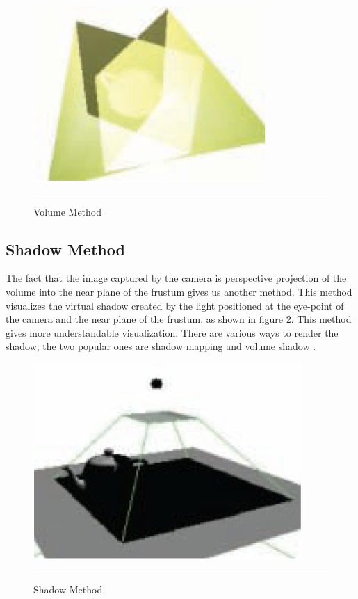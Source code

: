 \begin{figure}[htbp]
	\centering
	\includegraphics{./Primitives/theory_volume.png}
	\rule{35em}{0.5pt}
	\caption[Volume Method]{Volume Method}
	\label{fig:VolumeMethod}
\end{figure}

\subsection{Shadow Method}

The fact that the image captured by the camera is perspective projection of the volume into the near plane of the frustum gives us another method. This method visualizes the virtual shadow created by the light positioned at the eye-point of the camera and the near plane of the frustum, as shown in figure \ref{fig:ShadowMethod}. This method gives more understandable visualization. There are various ways to render the shadow, the two popular ones are shadow mapping \citep{Reference7} \citep{Reference8} and volume shadow \citep{Reference9}.

\begin{figure}[htbp]
	\centering
	\includegraphics{./Primitives/theory_shadow.png}
	\rule{35em}{0.5pt}
	\caption[Volume Method]{Shadow Method}
	\label{fig:ShadowMethod}
\end{figure}

